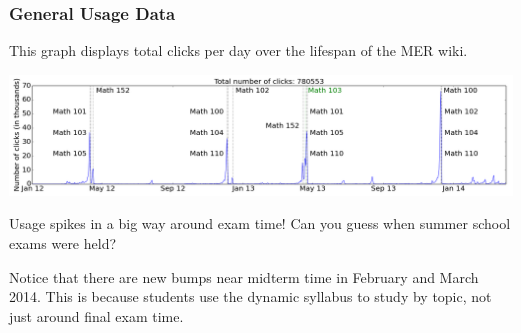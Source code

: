 \documentclass{beamer}
\begin{document}
\frame
{\frametitle{\bf{General Usage Data}}

This graph displays total clicks per day over the lifespan of the MER wiki.

\smallskip

\includegraphics[width=\textwidth]{spikes2.png}

\smallskip

Usage spikes in a big way around exam time! Can you guess when summer school exams were held?

\medskip

Notice that there are new bumps near midterm time in February and March 2014. This is because students use the dynamic syllabus to study by topic, not just around final exam time.

}
\end{document}
